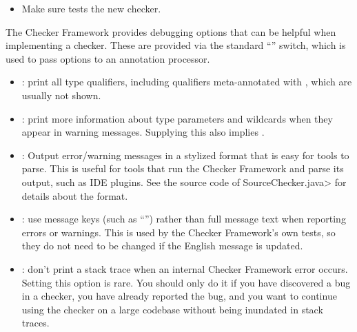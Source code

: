 \begin{itemize}

\item Make sure  tests the new checker.
\end{itemize}



The Checker Framework provides debugging options that can be helpful when
implementing a checker. These are provided via the standard  ``''
switch, which is used to pass options to an annotation processor.



\begin{itemize}
\item {}: print all type qualifiers, including
qualifiers meta-annotated with , which are
usually not shown.

\item {}: print more information about type
  parameters and wildcards when they appear in warning messages.  Supplying
  this also implies .

\item {}: Output error/warning messages in a
  stylized format that is easy for tools to parse.  This is useful for
  tools that run the Checker Framework and parse its output, such as IDE
  plugins.  See the source code of \<SourceChecker.java> for details about
  the format.

\item {}: use message keys (such as ``'')
rather than full message text when reporting errors or warnings.  This is
used by the Checker Framework's own tests, so they do not need to be
changed if the English message is updated.

\item {}: don't print a stack trace when an
internal Checker Framework error occurs.  Setting this option is rare.  You
should only do it if you have discovered a bug in a checker, you have
already reported the bug, and you want to continue using the checker on a
large codebase without being inundated in stack traces.

\end{itemize}

